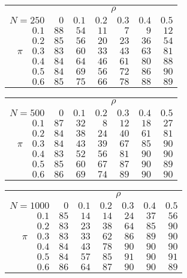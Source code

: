 \begin{tabular}{r|rrrrrr}
\hline\hline
 &\multicolumn{6}{c}{$\rho$} \\ 
 $N = 250$ & $0$ & $0.1$ & $0.2$ & $0.3$ & $0.4$ & $0.5$ \\ 
 \hline$0.1$ & $88$ & $54$ & $11$ & $7$ & $9$ & $12$\\ 
$0.2$ & $85$ & $56$ & $20$ & $23$ & $36$ & $54$\\ 
$\pi\quad$$0.3$ & $83$ & $60$ & $33$ & $43$ & $63$ & $81$\\ 
$0.4$ & $84$ & $64$ & $46$ & $61$ & $80$ & $88$\\ 
$0.5$ & $84$ & $69$ & $56$ & $72$ & $86$ & $90$\\ 
$0.6$ & $85$ & $75$ & $66$ & $78$ & $88$ & $89$\\ 
 \hline 
 \end{tabular}
 
 \vspace{2em} 
 
\begin{tabular}{r|rrrrrr}
\hline\hline
 &\multicolumn{6}{c}{$\rho$} \\ 
 $N = 500$ & $0$ & $0.1$ & $0.2$ & $0.3$ & $0.4$ & $0.5$ \\ 
 \hline$0.1$ & $87$ & $32$ & $8$ & $12$ & $18$ & $27$\\ 
$0.2$ & $84$ & $38$ & $24$ & $40$ & $61$ & $81$\\ 
$\pi\quad$$0.3$ & $84$ & $43$ & $39$ & $67$ & $85$ & $90$\\ 
$0.4$ & $83$ & $52$ & $56$ & $81$ & $90$ & $90$\\ 
$0.5$ & $85$ & $60$ & $67$ & $87$ & $90$ & $89$\\ 
$0.6$ & $86$ & $69$ & $74$ & $89$ & $90$ & $90$\\ 
 \hline 
 \end{tabular}
 
 \vspace{2em} 
 
\begin{tabular}{r|rrrrrr}
\hline\hline
 &\multicolumn{6}{c}{$\rho$} \\ 
 $N = 1000$ & $0$ & $0.1$ & $0.2$ & $0.3$ & $0.4$ & $0.5$ \\ 
 \hline$0.1$ & $85$ & $14$ & $14$ & $24$ & $37$ & $56$\\ 
$0.2$ & $83$ & $23$ & $38$ & $64$ & $85$ & $90$\\ 
$\pi\quad$$0.3$ & $83$ & $33$ & $62$ & $86$ & $89$ & $90$\\ 
$0.4$ & $84$ & $43$ & $78$ & $90$ & $90$ & $90$\\ 
$0.5$ & $84$ & $57$ & $85$ & $91$ & $90$ & $91$\\ 
$0.6$ & $86$ & $64$ & $87$ & $90$ & $90$ & $89$\\ 
 \hline 
 \end{tabular}